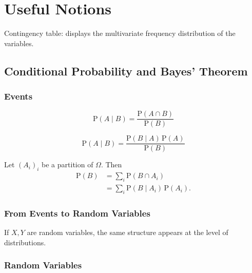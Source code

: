 \setcounter{section}{-1}

\section{Useful Notions}

Contingency table: displays the multivariate frequency distribution of the variables.

\subsection*{Conditional Probability and Bayes' Theorem}

\subsubsection*{Events}

\underline{}
\[
\mathrm{P}(A\mid B) = \frac{\mathrm{P}(A \cap B)}{\mathrm{P}(B)}
\]

\underline{}
\[
\mathrm{P}(A\mid B) = \frac{\mathrm{P}(B\mid A)\,\mathrm{P}(A)}{\mathrm{P}(B)}
\]

\underline{}

Let $(A_i)_i$ be a partition of $\Omega$. Then
\[
\begin{aligned}
\mathrm{P}(B)
&= \sum_i \mathrm{P}(B \cap A_i) \\
&= \sum_i \mathrm{P}(B\mid A_i)\,\mathrm{P}(A_i).
\end{aligned}
\]

\subsubsection*{From Events to Random Variables}

If $X,Y$ are random variables, the same structure appears at the level of distributions.

\subsubsection*{Random Variables}

